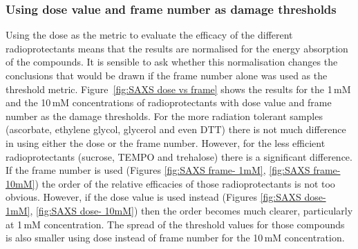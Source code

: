 \subsubsection{Using dose value and frame number as damage thresholds}
\label{subs:Using dose value and frame number as damage thresholds}
Using the dose as the metric to evaluate the efficacy of the different radioprotectants means that the results are normalised for the energy absorption of the compounds. It is sensible to ask whether this normalisation changes the conclusions that would be drawn if the frame number alone was used as the threshold metric.
Figure~\ref{fig:SAXS dose vs frame} shows the results for the 1\,mM and the 10\,mM concentrations of radioprotectants with dose value and frame number as the damage thresholds.
For the more radiation tolerant samples (ascorbate, ethylene glycol, glycerol and even DTT) there is not much difference in using either the dose or the frame number.
However, for the less efficient radioprotectants (sucrose, TEMPO and trehalose) there is a significant difference.
If the frame number is used (Figures \ref{fig:SAXS frame- 1mM}, \ref{fig:SAXS frame- 10mM}) the order of the relative efficacies of those radioprotectants is not too obvious.
However, if the dose value is used instead (Figures \ref{fig:SAXS dose- 1mM}, \ref{fig:SAXS dose- 10mM}) then the order becomes much clearer, particularly at 1\,mM concentration.
The spread of the threshold values for those compounds is also smaller using dose instead of frame number for the 10\,mM concentration.
